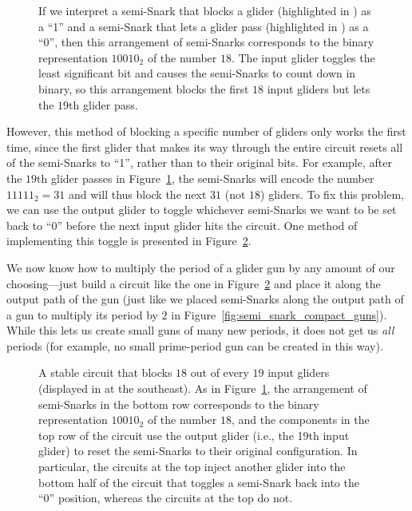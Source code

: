 \begin{figure}[!htb]
	\centering
	\caption{If we interpret a semi-Snark that blocks a glider (highlighted in ) as a ``1'' and a semi-Snark that lets a glider pass (highlighted in ) as a ``0'', then this arrangement of semi-Snarks corresponds to the binary representation $10010_2$ of the number $18$. The input glider toggles the least significant bit and causes the semi-Snarks to count down in binary, so this arrangement blocks the first $18$ input gliders but lets the $19$th glider pass.}
	\label{fig:block_18_gliders}
\end{figure}

However, this method of blocking a specific number of gliders only works the first time, since the first glider that makes its way through the entire circuit resets all of the semi-Snarks to ``1'', rather than to their original bits. For example, after the $19$th glider passes in Figure~\ref{fig:block_18_gliders}, the semi-Snarks will encode the number $11111_2 = 31$ and will thus block the next $31$ (not $18$) gliders. To fix this problem, we can use the output glider to toggle whichever semi-Snarks we want to be set back to ``0'' before the next input glider hits the circuit. One method of implementing this toggle is presented in Figure~\ref{fig:block_18_gliders_repeatable}.%

We now know how to multiply the period of a glider gun by any amount of our choosing---just build a circuit like the one in Figure~\ref{fig:block_18_gliders_repeatable} and place it along the output path of the gun (just like we placed semi-Snarks along the output path of a gun to multiply its period by $2$ in Figure~\ref{fig:semi_snark_compact_guns}). While this lets us create small guns of many new periods, it does not get us \emph{all} periods (for example, no small prime-period gun can be created in this way).

\begin{figure}[!htb]
	\centering
	\caption{A stable circuit that blocks $18$ out of every $19$ input gliders (displayed in  at the southeast). As in Figure~\ref{fig:block_18_gliders}, the arrangement of semi-Snarks in the bottom row corresponds to the binary representation $10010_2$ of the number $18$, and the components in the top row of the circuit use the output glider (i.e., the 19th input glider) to reset the semi-Snarks to their original configuration. In particular, the  circuits at the top inject another glider into the bottom half of the circuit that toggles a semi-Snark back into the ``0'' position, whereas the  circuits at the top do not.}
	\label{fig:block_18_gliders_repeatable}
\end{figure}


